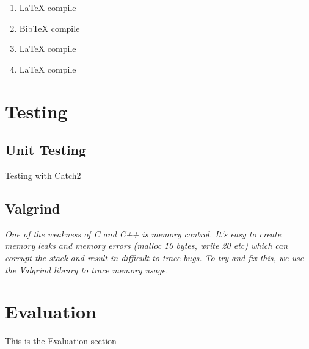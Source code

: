 \documentclass[11pt]{article}
\begin{document}
\begin{enumerate}
    \item LaTeX compile
    \item BibTeX compile
    \item LaTeX compile
    \item LaTeX compile
\end{enumerate}

\section{Testing}

\subsection{Unit Testing}
Testing with Catch2\cite{Catch2}

\subsection{Valgrind}
\textit{One of the weakness of C and C++ is memory control. It's easy to create memory leaks and memory errors (malloc 10 bytes, write 20 etc) which can corrupt the stack and result in difficult-to-trace bugs.
To try and fix this, we use the Valgrind library to trace memory usage.}


\section{Evaluation}

This is the Evaluation section


\printbibliography
\end{document}
